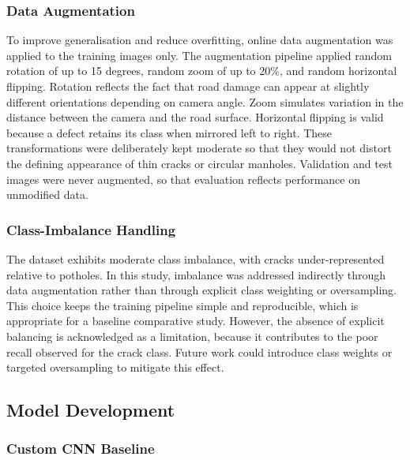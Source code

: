 \documentclass[preprint,12pt]{elsarticle}
\begin{document}
\subsubsection{Data Augmentation}

To improve generalisation and reduce overfitting, online data augmentation was applied to the training images only.
The augmentation pipeline applied random rotation of up to 15 degrees, random zoom of up to 20\%, and random horizontal flipping.
Rotation reflects the fact that road damage can appear at slightly different orientations depending on camera angle.
Zoom simulates variation in the distance between the camera and the road surface.
Horizontal flipping is valid because a defect retains its class when mirrored left to right.
These transformations were deliberately kept moderate so that they would not distort the defining appearance of thin cracks or circular manholes.
Validation and test images were never augmented, so that evaluation reflects performance on unmodified data.

\subsubsection{Class-Imbalance Handling}

The dataset exhibits moderate class imbalance, with cracks under-represented relative to potholes.
In this study, imbalance was addressed indirectly through data augmentation rather than through explicit class weighting or oversampling.
This choice keeps the training pipeline simple and reproducible, which is appropriate for a baseline comparative study.
However, the absence of explicit balancing is acknowledged as a limitation, because it contributes to the poor recall observed for the crack class.
Future work could introduce class weights or targeted oversampling to mitigate this effect.

\subsection{Model Development}

\subsubsection{Custom CNN Baseline}
\end{document}
